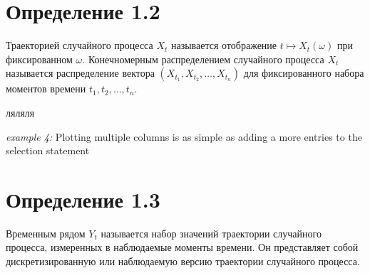 \section*{Определение 1.2}
Траекторией случайного процесса \( X_t \)
называется отображение \( t \mapsto X_t(\omega) \) при
фиксированном \( \omega \).
Конечномерным распределением случайного процесса \( X_t \)
называется распределение вектора \( (X_{t_1}, X_{t_2}, \ldots,
X_{t_n}) \) для фиксированного набора моментов
времени \( t_1, t_2, \ldots, t_n \).


 {ляляля}






\noindent
\begin{minipage}{\linewidth}

  \noindent\textit{example 4:} Plotting multiple columns is as simple
  as adding a more entries to the selection statement

  
\end{minipage}

\section*{Определение 1.3} Временным рядом \( Y_t \) называется
набор значений траектории случайного процесса,
измеренных в наблюдаемые моменты времени. Он представляет собой
дискретизированную или наблюдаемую версию траектории случайного процесса.

